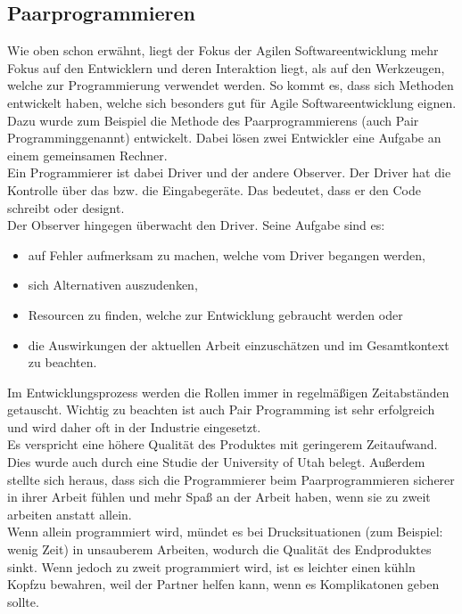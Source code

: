 \documentclass[a4paper, 10pt]{scrartcl}
\begin{document}
\subsection{Paarprogrammieren}
Wie oben schon erwähnt, liegt der Fokus der Agilen Softwareentwicklung mehr Fokus auf den Entwicklern und deren Interaktion liegt, als auf den Werkzeugen, welche zur Programmierung verwendet werden. So kommt es, dass sich Methoden entwickelt haben, welche sich besonders gut für Agile Softwareentwicklung eignen.\\
Dazu wurde zum Beispiel die Methode des Paarprogrammierens (auch \glqq Pair Programming\grqq genannt) entwickelt. Dabei lösen zwei Entwickler eine Aufgabe an einem gemeinsamen Rechner.\\ 
Ein Programmierer ist dabei \glqq Driver\grqq{} und der andere \glqq Observer\grqq.
Der Driver hat die Kontrolle über das bzw. die Eingabegeräte. Das bedeutet, dass er den Code schreibt oder designt.\\
Der Observer hingegen \glqq überwacht\grqq{} den Driver. Seine Aufgabe sind es:
\begin{itemize}
\item auf Fehler aufmerksam zu machen, welche vom Driver begangen werden,
\item sich Alternativen auszudenken,
\item Resourcen zu finden, welche zur Entwicklung gebraucht werden oder
\item die Auswirkungen der aktuellen Arbeit einzuschätzen und im Gesamtkontext zu beachten.
\end{itemize}
Im Entwicklungsprozess werden die Rollen immer in regelmäßigen Zeitabständen getauscht. Wichtig zu beachten ist auch
Pair Programming ist sehr erfolgreich und wird daher oft in der Industrie eingesetzt.\\
Es verspricht eine höhere Qualität des Produktes mit geringerem Zeitaufwand. Dies wurde auch durch eine Studie der University of Utah belegt. Außerdem stellte sich heraus, dass sich die Programmierer beim Paarprogrammieren sicherer in ihrer Arbeit fühlen und mehr Spaß an der Arbeit haben, wenn sie zu zweit arbeiten anstatt allein.\\
Wenn allein programmiert wird, mündet es bei Drucksituationen (zum Beispiel: wenig Zeit) in unsauberem Arbeiten, wodurch die Qualität des Endproduktes sinkt. Wenn jedoch zu zweit programmiert wird, ist es leichter einen \glqq kühln Kopf\grqq zu bewahren, weil der Partner helfen kann, wenn es Komplikatonen geben sollte. \citep{pairprogramming}
\end{document}
